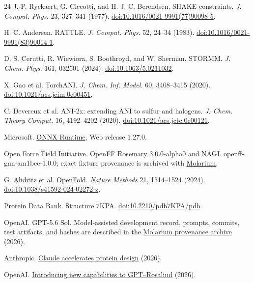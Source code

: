 \documentclass[10pt]{article}
\begin{document}
\begin{thebibliography}{24}
J.-P. Ryckaert, G. Ciccotti, and H. J. C. Berendsen. SHAKE constraints.
\emph{J. Comput. Phys.} 23, 327--341 (1977).
\href{https://doi.org/10.1016/0021-9991(77)90098-5}{doi:10.1016/0021-9991(77)90098-5}.

H. C. Andersen. RATTLE. \emph{J. Comput. Phys.} 52, 24--34 (1983).
\href{https://doi.org/10.1016/0021-9991(83)90014-1}{doi:10.1016/0021-9991(83)90014-1}.

D. S. Cerutti, R. Wiewiora, S. Boothroyd, and W. Sherman. STORMM. \emph{J.
Chem. Phys.} 161, 032501 (2024).
\href{https://doi.org/10.1063/5.0211032}{doi:10.1063/5.0211032}.

X. Gao et al. TorchANI. \emph{J. Chem. Inf. Model.} 60, 3408--3415 (2020).
\href{https://doi.org/10.1021/acs.jcim.0c00451}{doi:10.1021/acs.jcim.0c00451}.

C. Devereux et al. ANI-2x: extending ANI to sulfur and halogens. \emph{J. Chem.
Theory Comput.} 16, 4192--4202 (2020).
\href{https://doi.org/10.1021/acs.jctc.0c00121}{doi:10.1021/acs.jctc.0c00121}.

Microsoft. \href{https://onnxruntime.ai/}{ONNX Runtime}, Web release 1.27.0.

Open Force Field Initiative. OpenFF Rosemary 3.0.0-alpha0 and NAGL
openff-gnn-am1bcc-1.0.0; exact fixture provenance is archived with
\href{https://github.com/rafwiewiora/molarium/tree/main/openff}{Molarium}.

G. Ahdritz et al. OpenFold. \emph{Nature Methods} 21, 1514--1524 (2024).
\href{https://doi.org/10.1038/s41592-024-02272-z}{doi:10.1038/s41592-024-02272-z}.

Protein Data Bank. Structure 7KPA.
\href{https://doi.org/10.2210/pdb7KPA/pdb}{doi:10.2210/pdb7KPA/pdb}.

OpenAI. GPT-5.6 Sol. Model-assisted development record, prompts, commits, test
artifacts, and hashes are described in the
\href{https://github.com/rafwiewiora/molarium/blob/main/paper/PROVENANCE-ARCHIVE.md}{Molarium provenance archive} (2026).

Anthropic. \href{https://www.anthropic.com/research/Claude-accelerates-protein-design}{Claude
accelerates protein design} (2026).

OpenAI. \href{https://openai.com/index/introducing-new-capabilities-to-gpt-rosalind/}{Introducing
new capabilities to GPT--Rosalind} (2026).

\end{thebibliography}
\end{document}
